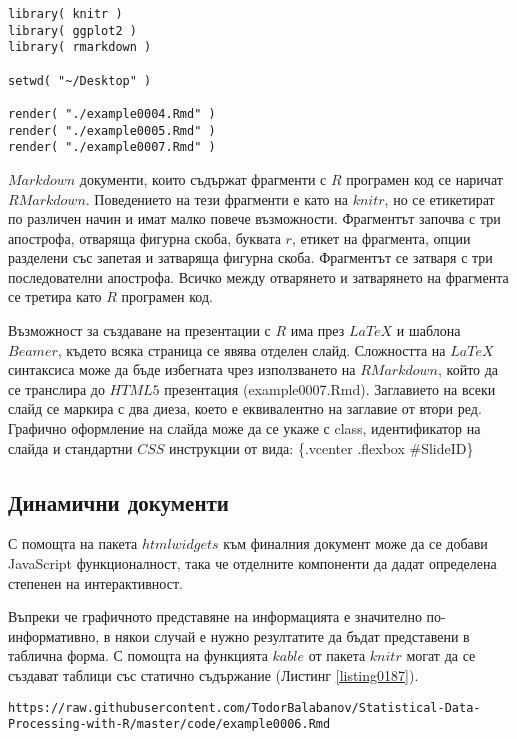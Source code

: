 \begin{lstlisting}[caption=Транслиране от RMarkdown в HTML и PDF, label=listing0185]
library( knitr )
library( ggplot2 )
library( rmarkdown )

setwd( "~/Desktop" )

render( "./example0004.Rmd" )
render( "./example0005.Rmd" )
render( "./example0007.Rmd" )
\end{lstlisting}

$Markdown$ документи, които съдържат фрагменти с $R$ програмен код се наричат $RMarkdown$. Поведението на тези фрагменти е като на $knitr$, но се етикетират по различен начин и имат малко повече възможности. Фрагментът започва с три апострофа, отваряща фигурна скоба, буквата $r$, етикет на фрагмента, опции разделени със запетая и затваряща фигурна скоба. Фрагментът се затваря с три последователни апострофа. Всичко между отварянето и затварянето на фрагмента се третира като $R$ програмен код. 

Възможност за създаване на презентации с $R$ има през $LaTeX$ и шаблона $Beamer$, където всяка страница се явява отделен слайд. Сложността на $LaTeX$ синтаксиса може да бъде избегната чрез използването на $RMarkdown$, който да се транслира до $HTML5$ презентация (example0007.Rmd). Заглавието на всеки слайд се маркира с два диеза, което е еквивалентно на заглавие от втори ред. Графично оформление на слайда може да се укаже с class, идентификатор на слайда и стандартни $CSS$ инструкции от вида: \{.vcenter .flexbox \#SlideID\}

\subsection{Динамични документи}

С помощта на пакета $htmlwidgets$ към финалния документ може да се добави JavaScript функционалност, така че отделните компоненти да дадат определена степенен на интерактивност. 

Въпреки че графичното представяне на информацията е значително по-информативно, в някои случай е нужно резултатите да бъдат представени в таблична форма. С помощта на функцията $kable$ от пакета $knitr$ могат да се създават таблици със статично съдържание (Листинг \ref{listing0187}).

\begin{lstlisting}[caption=Адрес на примерни интерактивни документ, label=listing0186]
https://raw.githubusercontent.com/TodorBalabanov/Statistical-Data-Processing-with-R/master/code/example0006.Rmd
\end{lstlisting}

